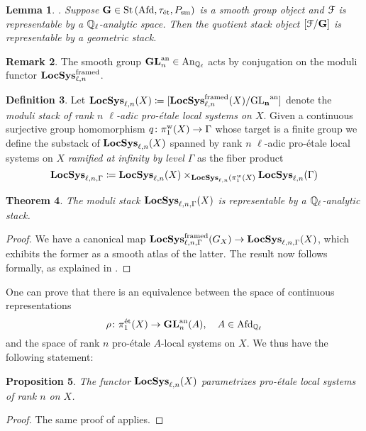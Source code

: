 \documentclass[10pt,a4paper]{amsart}
\numberwithin{equation}{subsection}
\theoremstyle{plain}
\newtheorem{theorem}{Theorem}[section]
\newtheorem{lemma}[theorem]{Lemma}
\newtheorem{prop}[theorem]{Proposition}
\theoremstyle{definition}
\newtheorem{defi}[theorem]{Definition}
\newtheorem{rema}[theorem]{Remark}
\theoremstyle{remark}
\numberwithin{equation}{section}
\begin{document}
\begin{lemma}{\cite[\S 2.3]{me1}.}
Suppose $ \mathbf G \in \mathrm{St} \left( \mathrm{Afd}, \tau_{\text{\'et}}, P_{\mathrm{sm}} \right) $ is a smooth group object and $\mathcal{F} $ is representable by a $\mathbb{Q}_{\ell}$-analytic space. Then the quotient stack object $[\mathcal{F}/ \mathbf G]$ is representable by a geometric stack.
\end{lemma}

\begin{rema}
The smooth group $\mathbf{GL}^{\mathrm{an}}_n \in \mathrm{An}_{\mathbb{Q}_\ell}$ acts by conjugation on the moduli functor $\mathbf{LocSys}_{\ell, n}^{\mathrm{framed}}$. 
\end{rema}

\begin{defi}
Let $\mathbf{LocSys}_{\ell, n}(X) \coloneqq [\mathbf{LocSys}_{\ell, n}^{\mathrm{framed}}(X) / \mathbf {\mathrm{GL}_n}^{\mathrm{an}}]$ denote the \emph{moduli stack of rank $n$ $\ell$-adic pro-\'etale local systems on $X$}. Given a continuous surjective group homomorphism $q \colon \mathrm {\pi_1^w}(X) \to \Gamma$ whose
target is a finite group we define the substack of $\mathbf{LocSys}_{\ell, n}(X)$ spanned by rank $n$ $\ell$-adic pro-\'etale local systems on $X$ \emph{ramified at infinity by level $\Gamma$} as the fiber product
	\[
		\mathbf{LocSys}_{\ell, n, \Gamma} \coloneqq \mathbf{LocSys}_{\ell, n}(X) \times_{\mathbf{LocSys}_{\ell, n} ( \pi_1^w(X)} \mathbf{LocSys}_{\ell, n}(\Gamma)
	\]
\end{defi}

\begin{theorem} \label{main1}
The moduli stack $\mathbf{LocSys}_{\ell, n, \Gamma}(X)$ is representable by a $\mathbb{Q}_{\ell}$-analytic stack.
\end{theorem}

\begin{proof}
We have a canonical map $ \mathbf{LocSys}_{\ell, n, \Gamma}^{\mathrm{framed}}(G_X)\to \mathbf{LocSys}_{\ell, n, \Gamma}(X)$, which exhibits the former as a smooth atlas of the latter. The result now follows formally, as explained in \cite[\S 2.3]{me1}.
\end{proof}

One can prove that there is an equivalence between the space of continuous representations
	\[
		\rho \colon \pi_1^{\text{\'et}}(X) \to \mathbf{GL}_n^{\mathrm{an}}(A), \quad A \in \mathrm{Afd}_{\mathbb{Q}_\ell}
	\]
and the space of rank $n$ pro-\'etale $A$-local systems on $X$. We thus have the following statement:

\begin{prop}{\cite[Corollary 3.2.5]{me1}}
The functor $\mathbf{LocSys}_{\ell, n}(X)$ parametrizes pro-\'etale local systems of rank $n$ on $X$.
\end{prop}

\begin{proof}
The same proof of \cite[Corollary 3.2.5]{me1} applies.
\end{proof}
\end{document}
